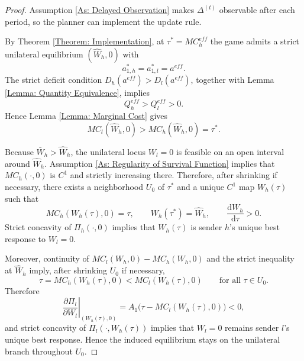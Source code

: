 \documentclass[12pt, a4paper]{article}
\begin{document}
\begin{proof}
    Assumption \ref{As: Delayed Observation} makes $\Delta^{(t)}$ observable after each period, so the planner can implement the update rule.

    By Theorem \ref{Theorem: Implementation}, at $\tau^* = MC_h^{eff}$ the game admits a strict unilateral equilibrium $(\hat{W}_h,0)$ with
    \[
        a_{1,h}^* = a_{1,l}^* = a^{eff}.
    \]
    The strict deficit condition $D_h(a^{eff}) > D_l(a^{eff})$, together with Lemma \ref{Lemma: Quantity Equivalence}, implies
    \[
        Q_h^{eff} > Q_l^{eff} > 0.
    \]
    Hence Lemma \ref{Lemma: Marginal Cost} gives
    \[
        MC_l(\hat{W}_h,0) > MC_h(\hat{W}_h,0) = \tau^*.
    \]

    Because $\bar{W}_h > \hat{W}_h$, the unilateral locus $W_l = 0$ is feasible on an open interval around $\hat{W}_h$. Assumption \ref{As: Regularity of Survival Function} implies that $MC_h(\cdot,0)$ is $C^1$ and strictly increasing there. Therefore, after shrinking if necessary, there exists a neighborhood $U_0$ of $\tau^*$ and a unique $C^1$ map $W_h(\tau)$ such that
    \[
        MC_h(W_h(\tau),0) = \tau,
        \qquad
        W_h(\tau^*) = \hat{W}_h,
        \qquad
        \frac{\mathrm{d}W_h}{\mathrm{d}\tau} > 0.
    \]
    Strict concavity of $\Pi_h(\cdot,0)$ implies that $W_h(\tau)$ is sender $h$'s unique best response to $W_l=0$.

    Moreover, continuity of $MC_l(W_h,0)-MC_h(W_h,0)$ and the strict inequality at $\hat{W}_h$ imply, after shrinking $U_0$ if necessary,
    \[
        \tau = MC_h(W_h(\tau),0) < MC_l(W_h(\tau),0)
        \qquad \text{for all } \tau \in U_0.
    \]
    Therefore
    \[
        \left.\frac{\partial \Pi_l}{\partial W_l}\right|_{(W_h(\tau),0)}
        = A_1\big(\tau - MC_l(W_h(\tau),0)\big) < 0,
    \]
    and strict concavity of $\Pi_l(\cdot,W_h(\tau))$ implies that $W_l=0$ remains sender $l$'s unique best response. Hence the induced equilibrium stays on the unilateral branch throughout $U_0$.


\end{proof}
\end{document}
